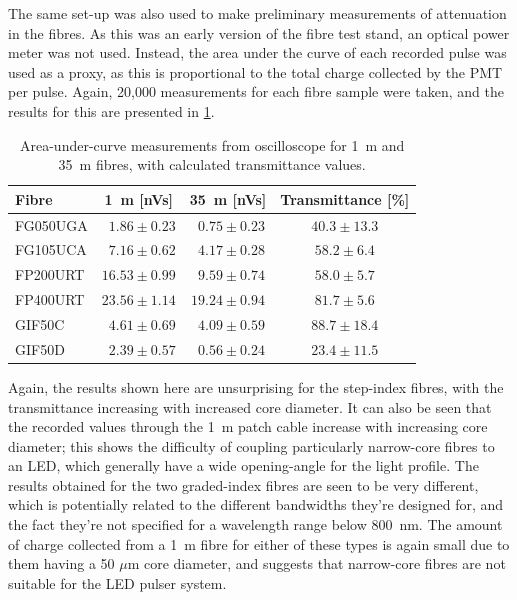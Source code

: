 \documentclass[a4paper,11pt]{article}
\begin{document}
The same set-up was also used to make preliminary measurements of attenuation in the fibres. As this was an early version of the fibre test stand, an optical power meter was not used. Instead, the area under the curve of each recorded pulse was used as a proxy, as this is proportional to the total charge collected by the PMT per pulse. Again, 20,000 measurements for each fibre sample were taken, and the results for this are presented in \cref{tab:attinit}.
\begin{table}[h]
\centering
\begin{tabular}{lccc}
\hline
Fibre	   & 1~m [nVs]  & 35~m [nVs] &  Transmittance [\%]	\\ \hline
FG050UGA   &  $\phantom{0}1.86\pm0.23$     &   $\phantom{0}0.75\pm0.23$     & \phantom{0}$40.3\pm13.3$     \\
FG105UCA   &  $\phantom{0}7.16\pm0.62$	    &   $\phantom{0}4.17\pm0.28$    & $58.2\pm6.4$     \\
FP200URT   &  $16.53\pm0.99$				&  	$\phantom{0}9.59\pm0.74$  	& $58.0\pm5.7$     \\
FP400URT   &  $23.56\pm1.14$    			&   $19.24\pm0.94$	 			& $81.7\pm5.6$     \\
GIF50C     &  $\phantom{0}4.61\pm0.69$     &   $\phantom{0}4.09\pm0.59$	 	& \phantom{0}$88.7\pm18.4$     \\
GIF50D     &  $\phantom{0}2.39\pm0.57$     &   $\phantom{0}0.56\pm0.24$     & \phantom{0}$23.4\pm11.5$    \\ \hline
\end{tabular}
\caption{Area-under-curve measurements from oscilloscope for 1~m and 35~m fibres, with calculated transmittance values.}\label{tab:attinit}
\end{table}
Again, the results shown here are unsurprising for the step-index fibres, with the transmittance increasing with increased core diameter. It can also be seen that the recorded values through the 1~m patch cable increase with increasing core diameter; this shows the difficulty of coupling particularly narrow-core fibres to an LED, which generally have a wide opening-angle for the light profile. The results obtained for the two graded-index fibres are seen to be very different, which is potentially related to the different bandwidths they're designed for, and the fact they're not specified for a wavelength range below 800~nm. The amount of charge collected from a 1~m fibre for either of these types is again small due to them having a 50 $\mu$m core diameter, and suggests that narrow-core fibres are not suitable for the LED pulser system.
\end{document}
